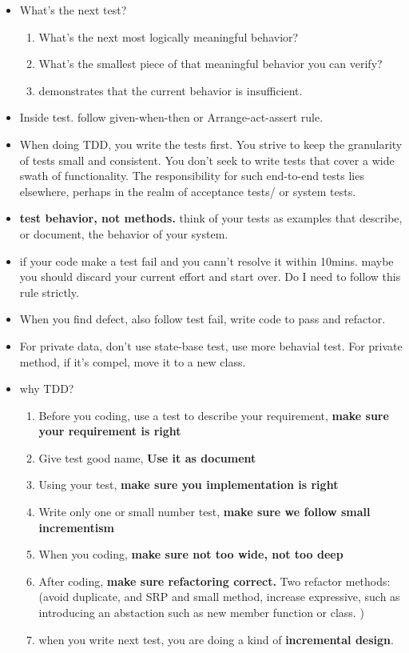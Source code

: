 \documentclass[a4paper,11pt,twoside]{book}
\begin{document}
\begin{itemize}
	\item What's the next test? 
	\begin{enumerate}
		\item What's the next most logically meaningful behavior?
		\item What's the smallest piece of that meaningful behavior you can verify?
		\item demonstrates that the current behavior is insufficient.
	\end{enumerate}

	\item Inside test. follow given-when-then or Arrange-act-assert rule. 
		
	\item When doing TDD, you write the tests first. You strive to keep the granularity of tests small and consistent. You don't seek to write tests that cover a wide swath of functionality. The responsibility for such end-to-end tests lies elsewhere, perhaps in the realm of acceptance tests/ or system tests. 
	
	\item \textbf{test behavior, not methods.} think of your tests as examples that describe, or document, the behavior of your system. 
		
		\item if your code make a test fail and you cann't resolve it within 10mins. maybe you should discard your current effort and start over. Do I need to follow this rule strictly. 
		
		\item When you find defect, also follow test fail, write code to pass and refactor.
		\item For private data,  don't use state-base test, use more behavial test. For private method, if it's compel, move it to a new class. 
		
		\item why TDD?
		\begin{enumerate}
			\item Before you coding, use a test to describe your requirement, \textbf{make sure your requirement is right}
			\item Give test good name, \textbf{Use it as document}
			\item Using your test, \textbf{make sure you implementation is right }
			\item Write only one or small number test, \textbf{make sure we follow small incrementism}
			\item When you coding, \textbf{make sure not too wide, not too deep}
			\item After coding, \textbf{make sure refactoring correct.} Two refactor methods: (avoid duplicate, and SRP and small method, increase expressive, such as introducing an abstaction such as new member function or class. )
			\item when you write next test, you are doing a kind of \textbf{incremental design}.
		\end{enumerate}
	
\end{itemize}
\end{document}
